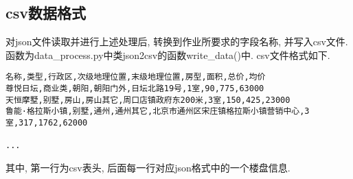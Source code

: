\subsection{csv数据格式}
对json文件读取并进行上述处理后, 转换到作业所要求的字段名称, 并写入csv文件.
函数为data\_process.py中类json2csv的函数write\_data()中.
csv文件格式如下.
\begin{lstlisting}
名称,类型,行政区,次级地理位置,末级地理位置,房型,面积,总价,均价
尊悦日坛,商业类,朝阳,朝阳门外,日坛北路19号,1室,90,775,63000
天恒摩墅,别墅,房山,房山其它,周口店镇政府东200米,3室,150,425,23000
鲁能·格拉斯小镇,别墅,通州,通州其它,北京市通州区宋庄镇格拉斯小镇营销中心,3室,317,1762,62000

...
\end{lstlisting}

其中, 第一行为csv表头, 后面每一行对应json格式中的一个楼盘信息.
